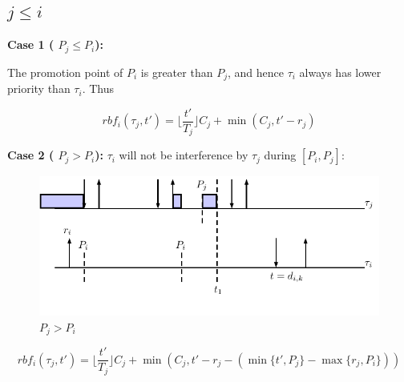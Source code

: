 \documentclass[12pt,conference,onecolumn]{IEEEtran}
\begin{document}
\subsection{$j\leq i$}
\textbf{Case 1 ( $P_j\leq P_i$):} 

The promotion point of $P_i$ is greater than $P_j$, and hence $\tau_i$ always has lower priority than $\tau_i$. Thus

	\begin{equation}
		rbf_i(\tau_j,t')=\lfloor \frac{t'}{T_j} \rfloor C_j +\min(C_j,t'-r_j)
	\end{equation}




\textbf{Case 2 ( $P_j> P_i$):} $\tau_i$ will not be interference by $\tau_j$ during $[P_i,P_j]$:
\begin{figure}[h!]
 \centering
\includegraphics[scale=1]{Figure/C2}  
\caption{$P_j> P_i$}
  \label{fig:p3}
\end{figure}
	\begin{equation}
		rbf_i(\tau_j,t')=\lfloor \frac{t'}{T_j} \rfloor C_j +\min\left(C_j,t'-r_j-\left(\min\{t',P_j\}-\max\{r_j,P_i\}\right)\right)
	\end{equation}





\end{document}
